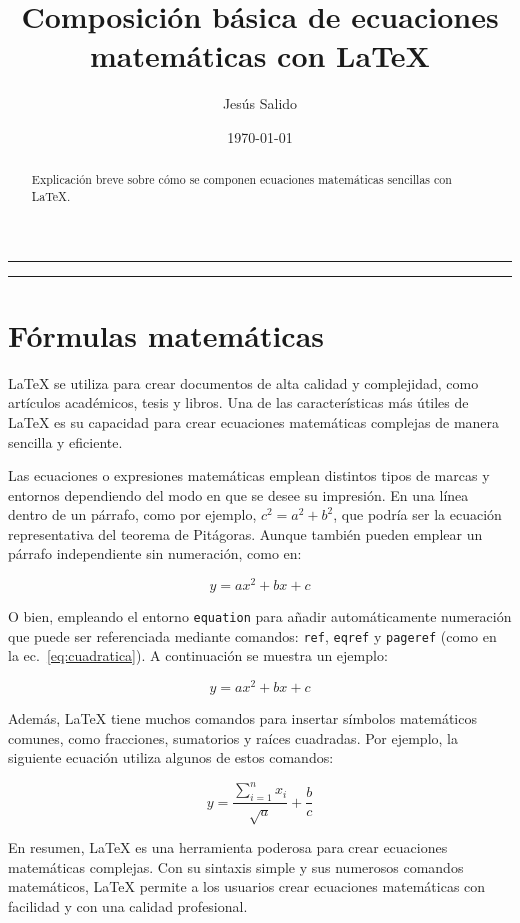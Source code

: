 \documentclass[11pt,a4paper]{article}
\author{Jesús Salido}
\title{Composición básica de ecuaciones matemáticas con \LaTeX{}}
\date{\today}
\begin{document}
\maketitle

\begin{abstract}
	Explicación breve sobre cómo se componen ecuaciones matemáticas sencillas con \LaTeX{}.
\end{abstract}

\hrule
\tableofcontents
\bigskip
\hrule

\section{Fórmulas matemáticas}
\LaTeX{} se utiliza para crear documentos de alta calidad y complejidad, como artículos académicos, tesis y libros. Una de las características más útiles de \LaTeX{} es su capacidad para crear ecuaciones matemáticas complejas de manera sencilla y eficiente.


Las ecuaciones o expresiones matemáticas emplean distintos tipos de marcas y entornos dependiendo del modo en que se desee su impresión. En una línea dentro de un párrafo, como por ejemplo, $c^{2}=a^{2}+b^{2}$, que podría ser la ecuación representativa del teorema de Pitágoras. Aunque también pueden emplear un párrafo independiente sin numeración, como en:

\[ 
    y = ax^2 + bx + c 
\]

O bien, empleando el entorno \texttt{equation} para añadir automáticamente numeración que puede ser referenciada mediante comandos: \texttt{ref}, \texttt{eqref} y \texttt{pageref} (como en la ec.~\ref{eq:cuadratica}). A continuación se muestra un ejemplo:

\begin{equation}\label{eq:cuadratica}
    y = ax^2 + bx + c 
\end{equation}

Además, \LaTeX{} tiene muchos comandos para insertar símbolos matemáticos comunes, como fracciones, sumatorios y raíces cuadradas. Por ejemplo, la siguiente ecuación utiliza algunos de estos comandos:

\begin{equation}
y = \frac{\sum_{i=1}^{n} x_i}{\sqrt{a}} + \frac{b}{c}
\end{equation}

En resumen, LaTeX es una herramienta poderosa para crear ecuaciones matemáticas complejas. Con su sintaxis simple y sus numerosos comandos matemáticos, LaTeX permite a los usuarios crear ecuaciones matemáticas con facilidad y con una calidad profesional.
\end{document}
